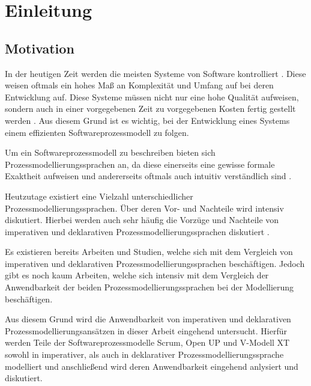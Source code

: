 \chapter{Einleitung}\label{sec:chapter1}



\section{Motivation}
In der heutigen Zeit werden die meisten Systeme von Software kontrolliert \cite{Puntambekar2007}. Diese weisen oftmals ein hohes Maß an Komplexität und Umfang auf bei deren Entwicklung auf. Diese Systeme müssen nicht nur eine hohe Qualität aufweisen, sondern auch in einer vorgegebenen Zeit zu vorgegebenen Kosten fertig gestellt werden \cite{Grechenig2010}. Aus diesem Grund ist es wichtig, bei der Entwicklung eines Systems einem effizienten Softwareprozessmodell zu folgen.\newline

Um ein Softwareprozessmodell zu beschreiben bieten sich Prozessmodellierungssprachen an, da diese einerseits eine gewisse formale Exaktheit aufweisen und andererseits oftmals auch intuitiv verständlich sind \cite{thomas2009,kircher2006}. \newline

Heutzutage existiert eine Vielzahl unterschiedlicher Prozessmodellierungssprachen. Über deren Vor- und Nachteile wird intensiv diskutiert. Hierbei werden auch sehr häufig die Vorzüge und Nachteile von imperativen und deklarativen Prozessmodellierungssprachen diskutiert \cite{fahland2009}. \newline

Es existieren bereits Arbeiten und Studien, welche sich mit dem Vergleich von imperativen und deklarativen Prozessmodellierungssprachen beschäftigen. Jedoch gibt es noch kaum Arbeiten, welche sich intensiv mit dem Vergleich der Anwendbarkeit der beiden Prozessmodellierungssprachen bei der Modellierung beschäftigen.\newline

Aus diesem Grund wird die Anwendbarkeit von imperativen und deklarativen Prozessmodellierungsansätzen in dieser Arbeit eingehend untersucht. Hierfür werden Teile der Softwareprozessmodelle Scrum, Open UP und V-Modell XT sowohl in imperativer, als auch in deklarativer Prozessmodellierungssprache modelliert und anschließend wird deren Anwendbarkeit eingehend anlysiert und diskutiert.\newline

